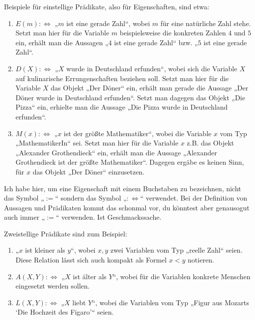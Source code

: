 \begin{bsp}
    Beispiele für einstellige Prädikate, also für Eigenschaften, sind etwa:
    \begin{enumerate}
        \item $E(m):\Leftrightarrow$ „$m$ ist eine gerade Zahl“, wobei $m$ für eine natürliche Zahl stehe. Setzt man hier für die Variable $m$ beispielsweise die konkreten Zahlen $4$ und $5$ ein, erhält man die Aussagen „$4$ ist eine gerade Zahl“ bzw. „$5$ ist eine gerade Zahl“.
        \item $D(X):\Leftrightarrow$ „$X$ wurde in Deutschland erfunden“, wobei sich die Variable $X$ auf kulinarische Errungenschaften beziehen soll. Setzt man hier für die Variable $X$ das Objekt „Der Döner“ ein, erhält man gerade die Aussage „Der Döner wurde in Deutschland erfunden“. Setzt man dagegen das Objekt „Die Pizza“ ein, erhielte man die Aussage „Die Pizza wurde in Deutschland erfunden“.
        \item $M(x):\Leftrightarrow $ „$x$ ist der größte Mathematiker“, wobei die Variable $x$ vom Typ „MathematikerIn“ sei. Setzt man hier für die Variable $x$ z.B. das Objekt „Alexander Grothendieck“ ein, erhält man die Aussage „Alexander Grothendieck ist der größte Mathematiker“. Dagegen ergäbe es keinen Sinn, für $x$ das Objekt „Der Döner“ einzusetzen.
    \end{enumerate}
    Ich habe hier, um eine Eigenschaft mit einem Buchstaben zu bezeichnen, nicht das Symbol „$:=$“ sondern das Symbol „$:\Leftrightarrow$“ verwendet. Bei der Definition von Aussagen und Prädikaten kommt das schonmal vor, du könntest aber genausogut auch immer „$:=$“ verwenden. Ist Geschmackssache.
\end{bsp}


\begin{bsp}
    Zweistellige Prädikate sind zum Beispiel:
    \begin{enumerate}
        \item „$x$ ist kleiner als $y$“, wobei $x,y$ zwei Variablen vom Typ „reelle Zahl“ seien. Diese Relation lässt sich auch kompakt als Formel $x<y$ notieren.
        \item $A(X,Y):\Leftrightarrow$ „$X$ ist älter als $Y$“, wobei für die Variablen konkrete Menschen eingesetzt werden sollen.
        \item $L(X,Y):\Leftrightarrow$ „$X$ liebt $Y$“, wobei die Variablen vom Typ „Figur aus Mozarts `Die Hochzeit des Figaro'“ seien.
    \end{enumerate}
\end{bsp}


